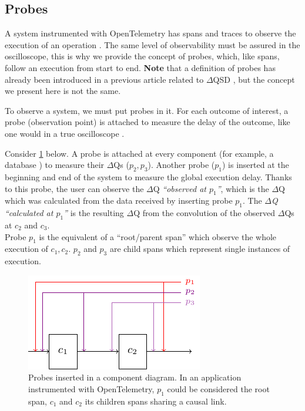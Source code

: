 \subsection{Probes}

A system instrumented with OpenTelemetry has spans and traces to observe the execution of an operation \cite{otel-t}. The same level of observability must be assured in the oscilloscope, this is why we provide the concept of probes, which, like spans, follow an execution from start to end. \textbf{Note} that a definition of probes has already been introduced in a previous article related to $\Delta$QSD \cite{dq-br}, but the concept we present here is not the same.

To observe a system, we must put probes in it. For each outcome of interest, a probe (observation point) is attached to measure the delay of the outcome, like one would in a true oscilloscope \cite{post}.

Consider \cref{fig:probes} below. A probe is attached at every component (for example, a database \cite{dq-tut}) to measure their $\Delta$Qs ($p_2, p_3$). Another probe ($p_1$) is inserted at the beginning and end of the system to measure the global execution delay. Thanks to this probe, the user can observe the $\Delta$Q \textit{``observed at $p_1$''}, which is the $\Delta$Q which was calculated from the data received by inserting probe $p_1$. The \textit{$\Delta$Q ``calculated at $p_1$''} is the resulting $\Delta$Q from the convolution of the observed $\Delta$Qs at $c_2$ and $c_3$. \\
Probe $p_1$ is the equivalent of a ``root/parent span'' which observe the whole execution of $c_1, c_2$. $p_2$ and $p_3$ are child spans which represent single instances of execution.

    \begin{figure}[H]
        \begin{center}
            \includegraphics[scale=1.8]{tikz/probes.pdf}
        \end{center}
        \caption{Probes inserted in a component diagram. In an application instrumented with OpenTelemetry, $p_1$ could be considered the root span, $c_1$ and $c_2$ its children spans sharing a causal link.}
        \label{fig:probes}
    \end{figure}



